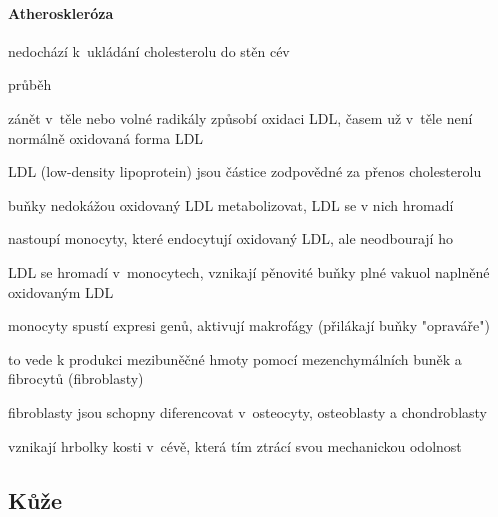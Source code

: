 \documentclass[DIV=8]{scrreprt}
\begin{document}
\paragraph{Atheroskleróza}
\begin{myItemize}[nosep]
    \item nedochází k ukládání cholesterolu do stěn cév
    \item průběh
\begin{myEnumerate}[nosep]
    \item zánět v těle nebo volné radikály způsobí oxidaci LDL, časem už v těle není normálně oxidovaná forma LDL
\begin{myItemize}[nosep]
    \item LDL (low-density lipoprotein) jsou částice zodpovědné za přenos cholesterolu
\end{myItemize}

    \item buňky nedokážou oxidovaný LDL metabolizovat, LDL se v nich hromadí
    \item nastoupí monocyty, které endocytují oxidovaný LDL, ale neodbourají ho
    \item LDL se hromadí v monocytech, vznikají pěnovité buňky plné vakuol naplněné oxidovaným LDL
    \item monocyty spustí expresi genů, aktivují makrofágy (přilákají buňky "opraváře")
    \item to vede k produkci mezibuněčné hmoty pomocí mezenchymálních buněk a fibrocytů (fibroblasty)
\begin{myItemize}[nosep]
    \item fibroblasty jsou schopny diferencovat v osteocyty, osteoblasty a chondroblasty
\end{myItemize}

    \item vznikají hrbolky kosti v cévě, která tím ztrácí svou mechanickou odolnost
\end{myEnumerate}

\end{myItemize}



\subsection{Kůže} \label{Kůže}
\end{document}
